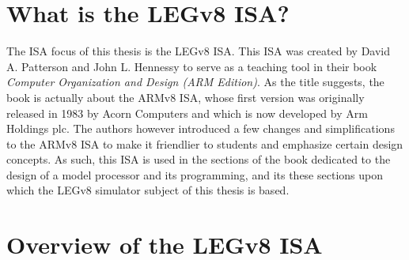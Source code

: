 \section*{What is the LEGv8 ISA?}

The ISA focus of this thesis is the LEGv8 ISA. This ISA was created by David A. Patterson and John L. Hennessy to serve as a teaching
tool in their book \emph{Computer Organization and Design (ARM Edition)}. As the title suggests, the book is actually about the ARMv8 ISA, whose first
version was originally released in 1983 by Acorn Computers and which is now developed by Arm Holdings plc. The authors however introduced a few
changes and simplifications to the ARMv8 ISA to make it friendlier to students and emphasize certain design concepts. As such, this ISA is used
in the sections of the book dedicated to the design of a model processor and its programming, and its these sections upon which the LEGv8 simulator
subject of this thesis is based.

\section*{Overview of the LEGv8 ISA}

